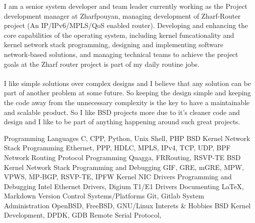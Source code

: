 \documentclass[12pt]{developercv}
\begin{document}
\begin{minipage}[t]{1\textwidth}
I am a senior system developer and team leader currently working
as the Project development manager at Zharfpouyan, managing development
of Zharf-Router project (An IP/IPv6/MPLS/QoS enabled router).
Developing and enhancing the core capabilities of the operating system,
including kernel funcationality and kernel network stack programming,
designing and implementing software network-based solutions, and managing
technical teams to achieve the project goals at the Zharf router project is
part of my daily routine jobs.
\\
\\
I like simple solutions over complex designs and I believe that any solution
can be part of another problem at some future. So keeping the design simple and
keeping the code away from the unnecessary complexity is the key to have a
maintainable and scalable product. So I like BSD projects more due to it's cleaner
code and design and I like to be part of anything happening around such great projects.

\end{minipage}
\hfill %
%

\begin{entrylist}
	\entry
		{}
		{Programming Languages}
		{}
		{C, CPP, Python, Unix Shell, PHP}
	\entry
		{}
		{BSD Kernel Network Stack Programming}
		{}
		{Ethernet, PPP, HDLC, MPLS, IPv4, TCP, UDP, BPF}
	\entry
		{}
		{Network Routing Protocol Programming}
		{}
		{Quagga, FRRouting, RSVP-TE}
	\entry
		{}
		{BSD Kernel Network Stack Programming and Debugging}
		{}
		{GIF, GRE, mGRE, MPW, VPWS, MP-BGP, RSVP-TE, IPFW}
	\entry
		{}
		{Kernel NIC Drivers Programming and Debugging}
		{}
		{Intel Ethernet Drivers, Digium T1/E1 Drivers} %
	\entry
		{}
		{Documenting}
		{}
		{\LaTeX, Markdown}
	\entry
		{}
		{Version Control Systems/Platforms}
		{}
		{Git, Gitlab}
	\entry
		{}
		{System Administration}
		{}
		{OpenBSD, FreeBSD, GNU/Linux}
	\entry
		{}
		{Interets \& Hobbies}
		{}
		{BSD Kernel Development, DPDK, GDB Remote Serial Protocol, }
\end{entrylist}
\end{document}
